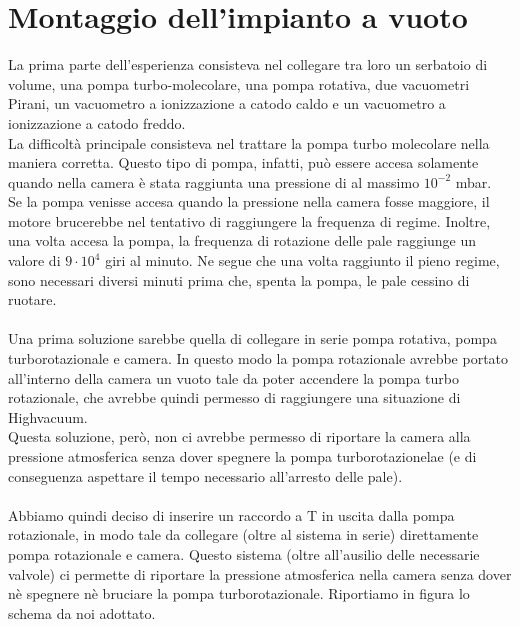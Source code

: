 \documentclass[11pt]{article}
\begin{document}
\section{Montaggio dell'impianto a vuoto}
La prima parte dell'esperienza consisteva nel collegare tra loro un serbatoio di volume, una pompa turbo-molecolare, una pompa rotativa, due vacuometri Pirani, un vacuometro a ionizzazione a catodo caldo e un vacuometro a ionizzazione a catodo freddo. 
\\La difficoltà principale consisteva nel trattare la pompa turbo molecolare nella maniera corretta. Questo tipo di pompa, infatti, può essere accesa solamente quando nella camera è stata raggiunta una pressione di al massimo $10^{-2}$ mbar.
\\ Se la pompa venisse accesa quando la pressione nella camera fosse maggiore, il motore brucerebbe nel tentativo di raggiungere la frequenza di regime. Inoltre, una volta accesa la pompa, la frequenza di rotazione delle pale raggiunge un valore di $9\cdot10^{4}$ giri al minuto. Ne segue che una volta raggiunto il pieno regime, sono necessari diversi minuti prima che, spenta la pompa, le pale cessino di ruotare. 
\\
\\
 \hspace*{5mm}Una prima soluzione sarebbe quella di collegare in serie pompa rotativa, pompa turborotazionale e camera. In questo modo la pompa rotazionale avrebbe portato all'interno della camera un vuoto tale da poter accendere la pompa turbo rotazionale, che avrebbe quindi permesso di raggiungere una situazione di Highvacuum. 
\\Questa soluzione, però, non ci avrebbe permesso di riportare la camera alla pressione atmosferica senza dover spegnere la pompa turborotazionelae (e di conseguenza aspettare il tempo necessario all'arresto delle pale).
 \\ 
 \\
 \hspace*{5mm}Abbiamo quindi deciso di inserire un raccordo a T in uscita dalla pompa rotazionale, in modo tale da collegare (oltre al sistema in serie) direttamente pompa rotazionale e camera. Questo sistema (oltre all'ausilio delle necessarie valvole) ci permette di riportare la pressione atmosferica nella camera senza dover nè spegnere nè bruciare la pompa turborotazionale. Riportiamo in figura lo schema da noi adottato.
\end{document}
